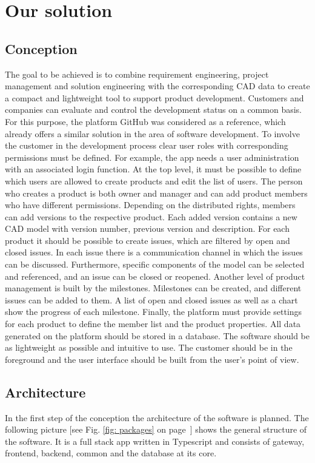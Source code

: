 \section{Our solution}
    \label{sec:contribution} 

    \subsection*{Conception}
    The goal to be achieved is to combine requirement engineering, project management and solution engineering with the corresponding CAD data to create a compact and lightweight tool to support product development. Customers and companies can evaluate and control the development status on a common basis. For this purpose, the platform GitHub was considered as a reference, which already offers a similar solution in the area of software development. To involve the customer in the development process clear user roles with corresponding permissions must be defined. For example, the app needs a user administration with an associated login function. At the top level, it must be possible to define which users are allowed to create products and edit the list of users. The person who creates a product is both owner and manager and can add product members who have different permissions. Depending on the distributed rights, members can add versions to the respective product. Each added version contains a new CAD model with version number, previous version and description. For each product it should be possible to create issues, which are filtered by open and closed issues. In each issue there is a communication channel in which the issues can be discussed. Furthermore, specific components of the model can be selected and referenced, and an issue can be closed or reopened. Another level of product management is built by the milestones. Milestones can be created, and different issues can be added to them. A list of open and closed issues as well as a chart show the progress of each milestone. Finally, the platform must provide settings for each product to define the member list and the product properties. All data generated on the platform should be stored in a database. The software should be as lightweight as possible and intuitive to use. The customer should be in the foreground and the user interface should be built from the user's point of view.

    \subsection*{Architecture}
    In the first step of the conception the architecture of the software is planned. The following picture [see Fig. \ref{fig: packages} on page~\pageref{fig: packages}] shows the general structure of the software. It is a full stack app written in Typescript and consists of gateway, frontend, backend, common and the database at its core. 
    
